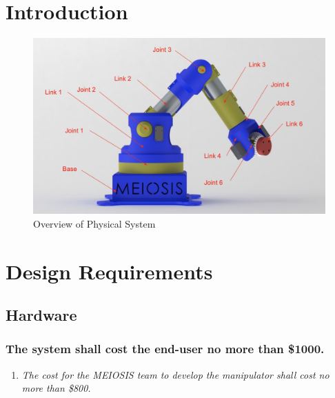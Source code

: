 \documentclass[12pt]{report}
\begin{document}
\normalem

{\tableofcontents\let\clearpage\relax\listoffigures}
\clearpage
\newpage


{}

\section{Introduction}
\raggedright
\begin{figure}[htp]
  \centering
  \includegraphics[frame,width=.75\textwidth]{model}
  \caption{Overview of Physical System}
  \label{fig:model}
\end{figure}
\section{Design Requirements}
\subsection{Hardware}

\subsubsection{The system shall cost the end-user no more than \$1000.}
\begin{enumerate}[label=\thesubsubsection.\alph*,leftmargin=3cm,font=\itshape]
  \item \textit{The cost for the MEIOSIS team to develop the manipulator shall cost no more than \$800.}
\end{enumerate}
\end{document}
